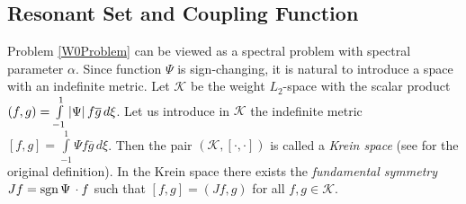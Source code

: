 \documentclass[11pt,english]{amsart}%
\begin{document}
\subsection{Resonant Set and Coupling Function}
Problem \eqref{W0Problem} can be viewed as a spectral problem with  spectral parameter $\alpha$.
Since function $\Psi$ is sign-changing, it is natural to introduce a space with an indefinite metric.
Let $\mathcal{K}$ be the weight $L_2$-space with the scalar product
$(f,g)=\int\limits_{-1}^1\left\vert\Psi\right\vert f\overline{g}\,d\xi$.
Let us introduce in $\mathcal{K}$ the indefinite metric $[f,g]=\int\limits_{-1}^1\Psi f \overline{g}\,d\xi$.
Then the pair $(\mathcal{K},[\cdot,\cdot])$  is called a \emph{Krein space}
(see \cite{IA} for the original definition). In the Krein space there exists the \emph{fundamental symmetry}
$Jf=\operatorname{sgn}\Psi\, \cdot f$ such that $[f,g]=(Jf,g)$ for all $f,g\in \mathcal{K}$.
\end{document}
